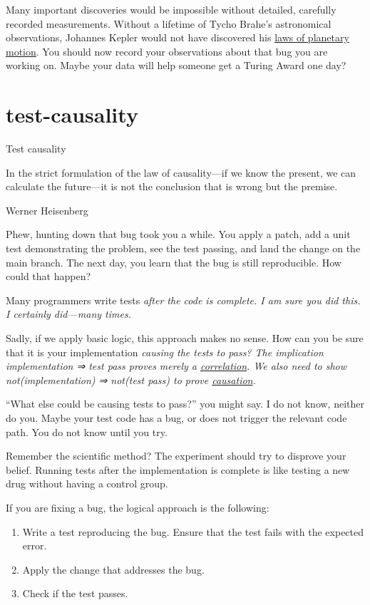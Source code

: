 \documentclass{article}
\begin{document}
Many important discoveries would be impossible without detailed, carefully recorded measurements.
Without a lifetime of Tycho Brahe's astronomical observations, Johannes Kepler would not have discovered his \href{https://en.wikipedia.org/wiki/Kepler%27s_laws_of_planetary_motion}{laws of planetary motion}.
You should now record your observations about that bug you are working on.
Maybe your data will help someone get a Turing Award one day?

\section{test-causality}{Test causality}
\epigraph{
  In the strict formulation of the law of causality---if we know the present, we can calculate the future---it is not the conclusion that is wrong but the premise.
}{Werner Heisenberg}

Phew, hunting down that bug took you a while.
You apply a patch, add a unit test demonstrating the problem, see the test passing, and land the change on the main branch.
The next day, you learn that the bug is still reproducible.
How could that happen?

Many programmers write tests \em{after} the code is complete.
I am sure you did this.
I certainly did—many times.

Sadly, if we apply basic logic, this approach makes no sense.
How can you be sure that it is your implementation \em{causing} the tests to pass?
The implication \em{implementation ⇒ test pass} proves merely a \href{https://en.wikipedia.org/wiki/Correlation}{correlation}.
We also need to show \em{not(implementation) ⇒ not(test pass)} to prove \href{https://en.wikipedia.org/wiki/Causality}{causation}.

``What else could be causing tests to pass?'' you might say.
I do not know, neither do you.
Maybe your test code has a bug, or does not trigger the relevant code path.
You do not know until you try.

Remember the scientific method?
The experiment should try to disprove your belief.
Running tests after the implementation is complete is like testing a new drug without having a control group.

If you are fixing a bug, the logical approach is the following:
\begin{enumerate}
  \item Write a test reproducing the bug. Ensure that the test fails with the expected error.
  \item Apply the change that addresses the bug.
  \item Check if the test passes.
\end{enumerate}
\end{document}
